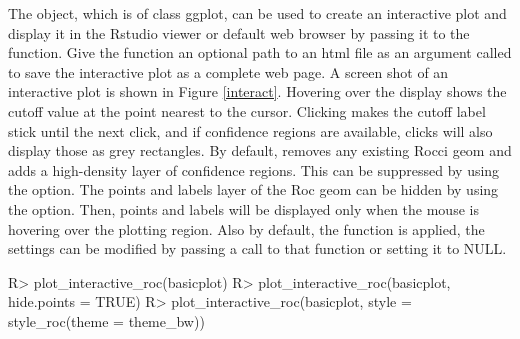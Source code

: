 \documentclass[codesnippet]{jss}
\begin{document}
The  object, which is of class ggplot, can be used to
create an interactive plot and display it in the Rstudio viewer or
default web browser by passing it to the 
function. Give the function an optional path to an html file as an
argument called  to save the interactive plot as a complete
web page. A screen shot of an interactive plot is shown in Figure
\ref{interact}. Hovering over the display shows the cutoff value at the
point nearest to the cursor. Clicking makes the cutoff label stick until
the next click, and if confidence regions are available, clicks will
also display those as grey rectangles. By default,
 removes any existing Rocci geom and adds a
high-density layer of confidence regions. This can be suppressed by
using the  option. The points and labels layer of
the Roc geom can be hidden by using the 
option. Then, points and labels will be displayed only when the mouse is
hovering over the plotting region. Also by default, the 
function is applied, the settings can be modified by passing a call to
that function or setting it to NULL.

\begin{Schunk}
\begin{Sinput}
R> plot_interactive_roc(basicplot)
R> plot_interactive_roc(basicplot, hide.points = TRUE)
R> plot_interactive_roc(basicplot, style = style_roc(theme = theme_bw))
\end{Sinput}
\end{Schunk}
\end{document}
